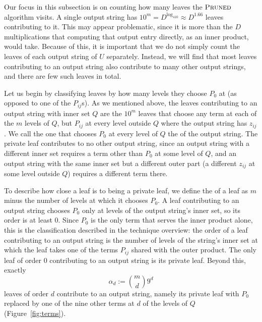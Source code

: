 Our focus in this subsection is on counting how many leaves the $\textnormal{\textsc{Pruned}}$ algorithm visits. A single output string has $10^m=D^{\log_410}\approx D^{1.66}$ leaves contributing to it. This may appear problematic, since it is more than the $D$ multiplications that computing that output entry directly, as an inner product, would take. Because of this, it is important that we do not simply count the leaves of each output string of $U$ separately. Instead, we will find that most leaves contributing to an output string also contribute to many other output strings, and there are few such leaves in total.

Let us begin by classifying leaves by how many levels they choose $P_0$ at (as opposed to one of the $P_{ij}$s). As we mentioned above, the leaves contributing to an output string with inner set $Q$ are the $10^m$ leaves that choose any term at each of the $m$ levels of $Q$, but $P_{ij}$ at every level outside $Q$ where the output string has $z_{ij}$. We call the one that chooses $P_0$ at every level of $Q$ the  of the output string. The private leaf contributes to no other output string, since an output string with a different inner set requires a term other than $P_0$ at some level of $Q$, and an output string with the same inner set but a different outer part (a different $z_{ij}$ at some level outside $Q$) requires a different term there. 

To describe how close a leaf is to being a private leaf, we define the  of a leaf as $m$ minus the number of levels at which it chooses $P_0$. A leaf contributing to an output string chooses $P_0$ only at levels of the output string's inner set, so its order is at least $0$. Since $P_0$ is the only term that serves the inner product alone, this is the classification described in the technique overview: the order of a leaf contributing to an output string is the number of levels of the string's inner set at which the leaf takes one of the terms $P_{ij}$ shared with the outer product. The only leaf of order $0$ contributing to an output string is its private leaf. Beyond this, exactly
\[
\alpha_d:=\binom md9^d
\]
leaves of order $d$ contribute to an output string, namely its private leaf with $P_0$ replaced by one of the nine other terms at $d$ of the levels of $Q$ (Figure~\ref{fig:terms}).

